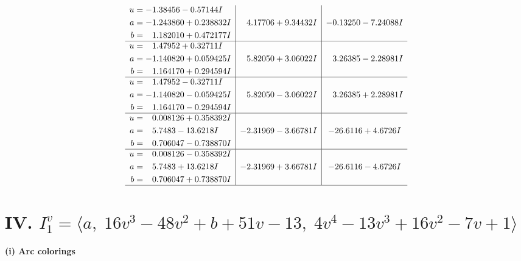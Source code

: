 \documentclass[1p]{elsarticle_modified}
\theoremstyle{definition}
\begin{document}
$$\begin{array}{c|c|c}
\begin{aligned}
u &= -1.38456 - 0.57144 I \\
a &= -1.243860 + 0.238832 I \\
b &= \phantom{-}1.182010 + 0.472177 I\end{aligned}
 & \phantom{-}4.17706 + 9.34432 I & -0.13250 - 7.24088 I \\ \hline\begin{aligned}
u &= \phantom{-}1.47952 + 0.32711 I \\
a &= -1.140820 + 0.059425 I \\
b &= \phantom{-}1.164170 + 0.294594 I\end{aligned}
 & \phantom{-}5.82050 + 3.06022 I & \phantom{-}3.26385 - 2.28981 I \\ \hline\begin{aligned}
u &= \phantom{-}1.47952 - 0.32711 I \\
a &= -1.140820 - 0.059425 I \\
b &= \phantom{-}1.164170 - 0.294594 I\end{aligned}
 & \phantom{-}5.82050 - 3.06022 I & \phantom{-}3.26385 + 2.28981 I \\ \hline\begin{aligned}
u &= \phantom{-}0.008126 + 0.358392 I \\
a &= \phantom{-}5.7483 - 13.6218 I \\
b &= \phantom{-}0.706047 - 0.738870 I\end{aligned}
 & -2.31969 - 3.66781 I & -26.6116 + 4.6726 I \\ \hline\begin{aligned}
u &= \phantom{-}0.008126 - 0.358392 I \\
a &= \phantom{-}5.7483 + 13.6218 I \\
b &= \phantom{-}0.706047 + 0.738870 I\end{aligned}
 & -2.31969 + 3.66781 I & -26.6116 - 4.6726 I\\
 \hline 
 \end{array}$$\newpage\newpage\renewcommand{\arraystretch}{1}
\centering \section*{IV. $I^v_{1}= \langle a,\;16 v^3-48 v^2+b+51 v-13,\;4 v^4-13 v^3+16 v^2-7 v+1 \rangle$}
\flushleft \textbf{(i) Arc colorings}\\
\end{document}
